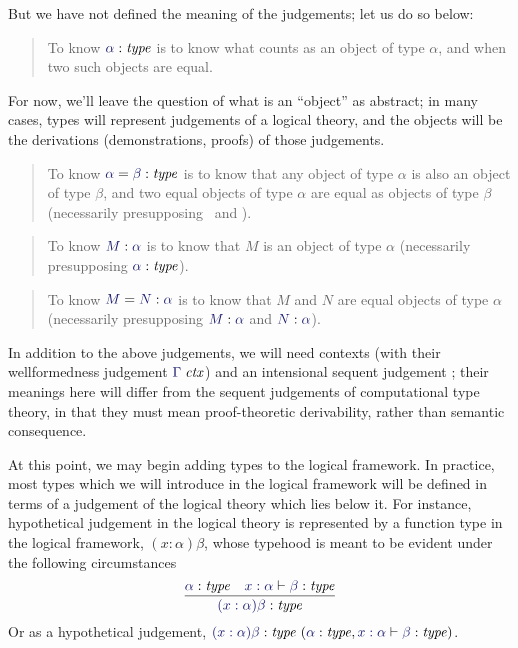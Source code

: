 \documentclass[main.tex]{subfiles}
\begin{document}
But we have not defined the meaning of the judgements; let us do so below:

\begin{quote}
  To know $\type\alpha$ is to know what counts as an object of type $\alpha$,
  and when two such objects are equal.
\end{quote}

For now, we'll leave the question of what is an ``object'' as
abstract; in many cases, types will represent judgements of a logical
theory, and the objects will be the derivations (demonstrations,
proofs) of those judgements.

\begin{quote}
  To know $\etype{\alpha}{\beta}$ is to know that any object of type $\alpha$ is
  also an object of type $\beta$, and two equal objects of type $\alpha$ are
  equal as objects of type $\beta$ (necessarily presupposing \type\alpha\ and
  \type\beta).
\end{quote}

\begin{quote}
  To know $\ofty{M}{\alpha}$ is to know that $M$ is an object of type $\alpha$
  (necessarily presupposing $\type\alpha$).
\end{quote}

\begin{quote}
  To know $\eofty{M}{N}{\alpha}$ is to know that $M$ and $N$ are equal objects of type
  $\alpha$ (necessarily presupposing $\ofty{M}{\alpha}$ and $\ofty{N}{\alpha}$).
\end{quote}

In addition to the above judgements, we will need contexts (with their
wellformedness judgement $\isctx{\Gamma}$) and an intensional sequent judgement
; their meanings here will differ
from the sequent judgements of computational type theory, in that they must
mean proof-theoretic derivability, rather than semantic consequence.

At this point, we may begin adding types to the logical framework. In
practice, most types which we will introduce in the logical framework
will be defined in terms of a judgement of the logical theory which
lies below it.  For instance, hypothetical judgement in the logical
theory is represented by a function type in the logical framework,
$(x:\alpha)\beta$, whose typehood is meant to be evident under the
following circumstances
\[
  \infer{
    \type{(x:\alpha)\beta}
  }{
    \type\alpha &
    \lfsequent{x:\alpha}{\type\beta}
  }
\]
Or as a hypothetical judgement,
$\hyp{\type{(x:\alpha)\beta}}{\type\alpha,\lfsequent{x:\alpha}{\type\beta}}$.
\end{document}
